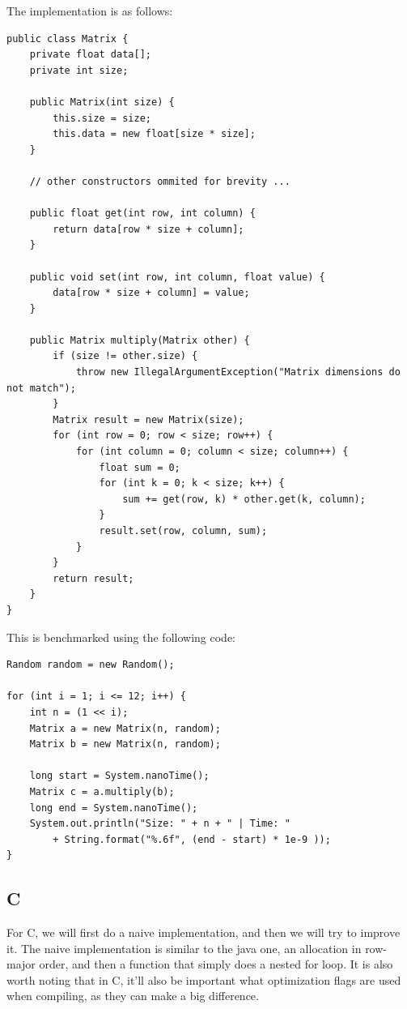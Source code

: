 \documentclass{article}
\begin{document}
The implementation is as follows:

\begin{verbatim}
public class Matrix {
	private float data[];
	private int size;

	public Matrix(int size) {
		this.size = size;
		this.data = new float[size * size];
	}

	// other constructors ommited for brevity ...

	public float get(int row, int column) {
		return data[row * size + column];
	}

	public void set(int row, int column, float value) {
		data[row * size + column] = value;
	}

	public Matrix multiply(Matrix other) {
		if (size != other.size) {
			throw new IllegalArgumentException("Matrix dimensions do not match");
		}
		Matrix result = new Matrix(size);
		for (int row = 0; row < size; row++) {
			for (int column = 0; column < size; column++) {
				float sum = 0;
				for (int k = 0; k < size; k++) {
					sum += get(row, k) * other.get(k, column);
				}
				result.set(row, column, sum);
			}
		}
		return result;
	}
}

\end{verbatim}

This is benchmarked using the following code:

\begin{verbatim}
Random random = new Random();

for (int i = 1; i <= 12; i++) {
	int n = (1 << i);
	Matrix a = new Matrix(n, random);
	Matrix b = new Matrix(n, random);

	long start = System.nanoTime();
	Matrix c = a.multiply(b);
	long end = System.nanoTime();
	System.out.println("Size: " + n + " | Time: "
		+ String.format("%.6f", (end - start) * 1e-9 ));
}
\end{verbatim}

\subsection{C}

For C, we will first do a naive implementation, and then we will try to improve it.
The naive implementation is similar to the java one, an allocation in row-major order, and then a function that simply does a nested for loop.
It is also worth noting that in C, it'll also be important what optimization flags are used when compiling, as they can make a big difference.
\end{document}
